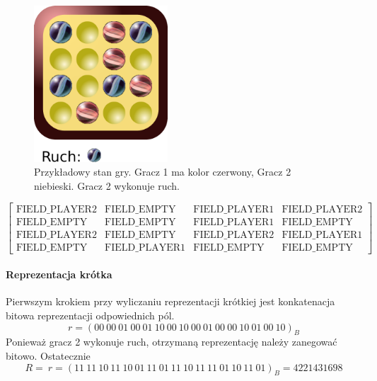 \documentclass{scrartcl}
\begin{document}
\begin{figure}[h!]
  \centering
  \includegraphics[width=5cm]{data/example_board.pdf}
  \caption{Przykładowy stan gry. Gracz 1 ma kolor czerwony, Gracz 2
niebieski. Gracz 2 wykonuje ruch.}
  \label{fig:example_state}
\end{figure}

\[ \begin{bmatrix}
\text{FIELD\_PLAYER2} & \text{FIELD\_EMPTY} & 
\text{FIELD\_PLAYER1} & \text{FIELD\_PLAYER2} \\ 
\text{FIELD\_EMPTY} & \text{FIELD\_EMPTY} & 
\text{FIELD\_PLAYER1} & \text{FIELD\_EMPTY} \\ 
\text{FIELD\_PLAYER2} & \text{FIELD\_EMPTY} & 
\text{FIELD\_PLAYER2} & \text{FIELD\_PLAYER1} \\ 
\text{FIELD\_EMPTY} & \text{FIELD\_PLAYER1} & 
\text{FIELD\_EMPTY} & \text{FIELD\_EMPTY}
\end{bmatrix}
\]

\paragraph{Reprezentacja krótka} Pierwszym krokiem przy wyliczaniu reprezentacji krótkiej jest 
konkatenacja bitowa reprezentacji odpowiednich pól.
\[r = (00\ 00\ 01\ 00\ 01\ 10\ 00\ 10\ 00\ 01\ 00\ 00\ 10\ 01\ 00\ 10
)_B \]
Ponieważ gracz 2 wykonuje ruch, otrzymaną reprezentację należy
zanegować bitowo. Ostatecznie
\[R = ~r = (11\ 11\ 10\ 11\ 10\ 01\ 11\ 01\ 11\ 10\ 11\ 11\ 01\ 10\ 11\ 01)_B
= 4221431698 \]
\end{document}

